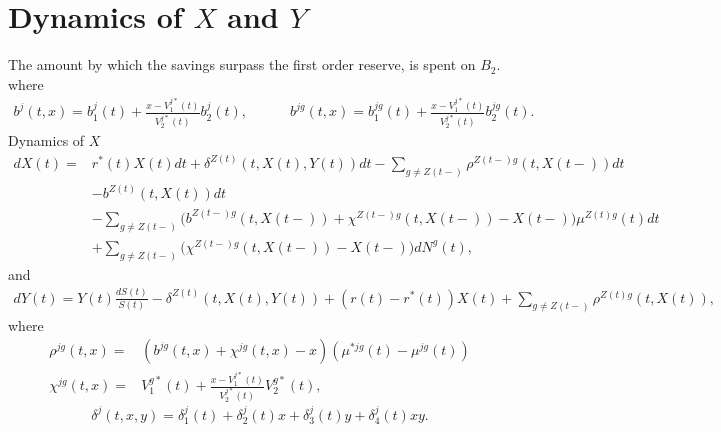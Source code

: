 \documentclass[12pt]{article}
\theoremstyle{my_thm}
\begin{document}
\section{Dynamics of $X$ and $Y$}
\label{seq:Dyn}
The amount by which the savings surpass the first order reserve, is spent on $B_2$. 
where
\begin{gather*}
b^j(t,x)=b_1^j(t)+\frac{x-V_1^{j*}(t)}{V_2^{j*}(t)}b^j_2(t),
\qquad \quad
b^{jg}(t,x)=b_1^{jg}(t)+\frac{x-V_1^{j*}(t)}{V_2^{j*}(t)}b^{jg}_2(t).
\end{gather*}
Dynamics of $X$
\begin{align*}
dX(t)=&
r^*(t)X(t)dt
 +\delta^{Z(t)}(t,X(t),Y(t))  dt- \sum_{g \neq Z(t-)} \rho^{Z(t-)g}(t,X(t-)) dt
 \nonumber 
\\
\nonumber
&- b^{Z(t)}(t,X(t)) dt
\\
&- \sum_{g\neq Z(t-)}\bigg(b^{Z(t-)g}(t,X(t-))+\chi^{Z(t-)g}(t,X(t-))-X(t-) \bigg) \mu^{Z(t)g}(t)dt
\\
&+ \sum_{g\neq Z(t-)}\bigg(\chi^{Z(t-)g}(t,X(t-))-X(t-) \bigg)  dN^g(t),
\end{align*}
and
\begin{align*}
dY(t)=Y(t)\frac{dS(t)}{S(t)}-\delta^{Z(t)}(t,X(t),Y(t)) + (r(t)-r^*(t)) X(t) + \sum_{g \neq Z(t-)} \rho^{Z(t)g}(t,X(t)),
\end{align*}
where
\begin{align*}
\rho^{jg}(t,x)=&(b^{jg}(t,x)+ \chi^{jg}(t,x)-x) (\mu^{*jg}(t)-\mu^{jg}(t))
\\
\chi^{jg}(t,x)=& V^{g*}_1(t) + \frac{x-V^{j*}_1(t)}{V^{j*}_2(t)}V^{g*}_2(t),
\end{align*}
\begin{equation}
\delta^j(t,x,y)=\delta_1^j(t)+\delta_2^j(t)x+\delta_3^j(t)y+\delta_4^j(t)xy.
\end{equation}
\end{document}
